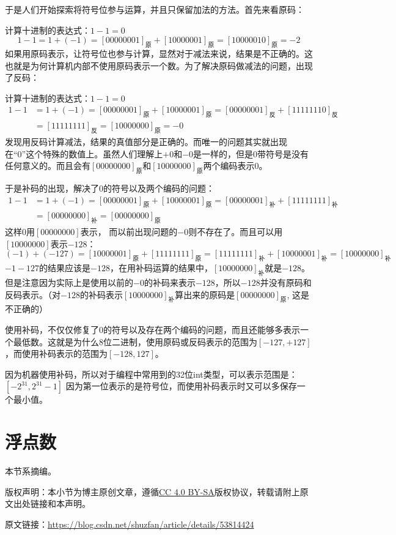 于是人们开始探索将符号位参与运算，并且只保留加法的方法。首先来看原码：

计算十进制的表达式：$1-1=0$
$$1-1=1+(-1)=[00000001]_{\textrm{原}}+[10000001]_{\textrm{原}}=[10000010]_{\textrm{原}}=-2$$
如果用原码表示，让符号位也参与计算，显然对于减法来说，结果是不正确的。这也就是为何计算机内部不使用原码表示一个数。为了解决原码做减法的问题，出现了反码：

计算十进制的表达式：$1-1=0$
\[\begin{split}
1-1&=1+(-1)=[00000001]_{\textrm{原}}+[10000001]_{\textrm{原}}=[00000001]_{\textrm{反}}+[11111110]_{\textrm{反}}\\
&=[11111111]_{\textrm{反}}=[10000000]_{\textrm{原}}=-0
\end{split}\]
发现用反码计算减法，结果的真值部分是正确的。而唯一的问题其实就出现在“0”这个特殊的数值上。虽然人们理解上$+0$和$-0$是一样的，但是0带符号是没有任何意义的。而且会有$[00000000]_{\textrm{原}}$和$[10000000]_{\textrm{原}}$两个编码表示0。

于是补码的出现，解决了0的符号以及两个编码的问题：
\[\begin{split}
1-1&=1+(-1)=[00000001]_{\textrm{原}}+[10000001]_{\textrm{原}}=[00000001]_{\textrm{补}}+[11111111]_{\textrm{补}}\\
&=[00000000]_{\textrm{补}}=[00000000]_{\textrm{原}}
\end{split}\]
这样0用$[00000000]$表示， 而以前出现问题的$-0$则不存在了。而且可以用$[10000000]$表示$-128$：
$$(-1)+(-127)=[10000001]_{\textrm{原}}+[11111111]_{\textrm{原}}=[11111111]_{\textrm{补}}+[10000001]_{\textrm{补}}=[10000000]_{\textrm{补}}$$
$-1-127$的结果应该是$-128$，在用补码运算的结果中，$[1000 0000]_{\textrm{补}}$就是$-128$。但是注意因为实际上是使用以前的$-0$的补码来表示$-128$，所以$-128$并没有原码和反码表示。（对$-128$的补码表示$[10000000]_{\textrm{补}}$算出来的原码是$[0000 0000]_{\textrm{原}}$, 这是不正确的）

使用补码，不仅仅修复了0的符号以及存在两个编码的问题，而且还能够多表示一个最低数。这就是为什么8位二进制，使用原码或反码表示的范围为$[-127,+127]$，而使用补码表示的范围为$[-128,127]$。

因为机器使用补码，所以对于编程中常用到的32位int类型，可以表示范围是：$[-2^{31},2^{31}-1]$ 因为第一位表示的是符号位，而使用补码表示时又可以多保存一个最小值。

\section{浮点数}
\begin{note}{}{}
本节系摘编。

版权声明：本小节为博主原创文章，遵循\href{http://creativecommons.org/licenses/by-sa/4.0/}{CC 4.0 BY-SA}版权协议，转载请附上原文出处链接和本声明。

原文链接：\url{https://blog.csdn.net/shuzfan/article/details/53814424}
\end{note}

